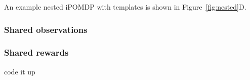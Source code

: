 \documentclass[11pt]{article}
\begin{document}
An example nested iPOMDP with templates is shown in Figure~\ref{fig:nested}D.



\subsubsection{Shared observations}

\subsubsection{Shared rewards}


code it up




\renewcommand{\refname}{Bibliography \& References Cited}

\end{document}
